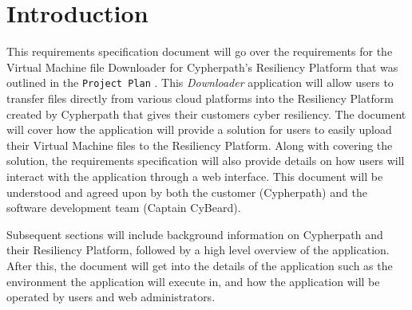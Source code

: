 \documentclass{article}
\begin{document}
    


    \tableofcontents
    \newpage
    \listoffigures


    \newpage
    \begin{versionhistory}
    \end{versionhistory}
    \newpage


    \section{Introduction}
    This requirements specification document will go over the requirements for the Virtual Machine file Downloader for Cypherpath's Resiliency Platform \cite{cypherpath} that was outlined in the
    \texttt{Project Plan} \cite{projectplan}. This \textit{Downloader} application will allow users to transfer files directly from various cloud platforms into the Resiliency Platform
    created by Cypherpath that gives their customers cyber resiliency.
    The document will cover how the application will provide a solution for users to easily upload their Virtual Machine files to the Resiliency Platform.
    Along with covering the solution, the requirements specification will also provide details on how users will interact with the application through a web interface.
    This document will be understood and agreed upon by both the customer (Cypherpath) and the software development team (Captain CyBeard).

    Subsequent sections will include background information on Cypherpath and their Resiliency Platform, followed by a high level overview of the application. After this, the document will get into the
    details of the application such as the environment the application will execute in, and how the application will be operated by users and web administrators.
\end{document}
